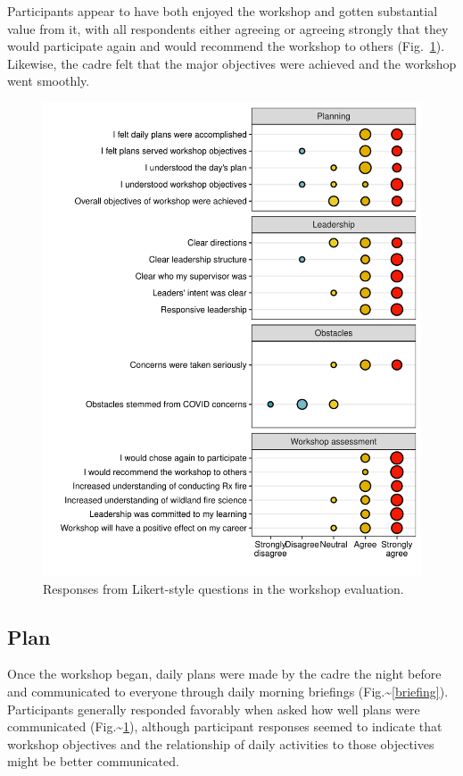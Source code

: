 \documentclass[fire,article,submit,moreauthors,pdftex]{Definitions/mdpi}
\begin{document}
Participants appear to have both enjoyed the workshop and gotten substantial value from it, with all respondents either agreeing or agreeing strongly that they would participate again and would recommend the workshop to others (Fig.~\ref{likert}).
Likewise, the cadre felt that the major objectives were achieved and the workshop went smoothly.

\begin{figure}
\centering
\includegraphics[width=1\columnwidth]{likert_gg-1.pdf}
\caption{Responses from Likert-style questions in the workshop evaluation. \label{likert}}
\end{figure}

\hypertarget{plan}{%
\subsection{Plan}\label{plan}}

Once the workshop began, daily plans were made by the cadre the night before and communicated to everyone through daily morning briefings (Fig.\textasciitilde{}\ref{briefing}).
Participants generally responded favorably when asked how well plans were communicated (Fig.\textasciitilde{}\ref{likert}), although participant responses seemed to indicate that workshop objectives and the relationship of daily activities to those objectives might be better communicated.
\end{document}
